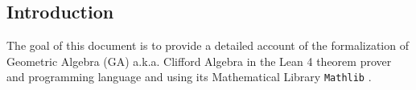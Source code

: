 \subsection*{Introduction}
\label{sec:intro}

The goal of this document is to provide a detailed account
of the formalization of Geometric Algebra (GA) a.k.a. Clifford Algebra \cite{hestenes2012clifford}
in the Lean 4 theorem prover and programming language \cite{moura2021lean, lean_2015, ullrich2023extensible}
and using its Mathematical Library \texttt{Mathlib} \cite{themathlibcommunityLeanMathematicalLibrary2020}.

